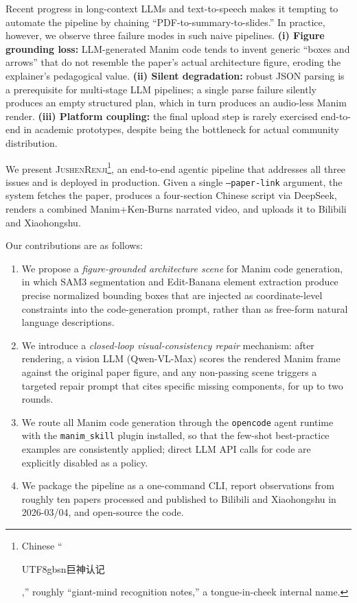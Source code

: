 \documentclass[11pt,a4paper]{article}
\begin{document}
Recent progress in long-context LLMs and text-to-speech makes it tempting to automate the pipeline by chaining ``PDF-to-summary-to-slides.'' In practice, however, we observe three failure modes in such naive pipelines. \textbf{(i) Figure grounding loss:} LLM-generated Manim code tends to invent generic ``boxes and arrows'' that do not resemble the paper's actual architecture figure, eroding the explainer's pedagogical value. \textbf{(ii) Silent degradation:} robust JSON parsing is a prerequisite for multi-stage LLM pipelines; a single parse failure silently produces an empty structured plan, which in turn produces an audio-less Manim render. \textbf{(iii) Platform coupling:} the final upload step is rarely exercised end-to-end in academic prototypes, despite being the bottleneck for actual community distribution.

We present \textsc{JushenRenji}\footnote{Chinese ``\begin{CJK}{UTF8}{gbsn}巨神认记\end{CJK},'' roughly ``giant-mind recognition notes,'' a tongue-in-cheek internal name.}, an end-to-end agentic pipeline that addresses all three issues and is deployed in production. Given a single \texttt{--paper-link} argument, the system fetches the paper, produces a four-section Chinese script via DeepSeek, renders a combined Manim+Ken-Burns narrated video, and uploads it to Bilibili and Xiaohongshu.

Our contributions are as follows:
\begin{enumerate}[leftmargin=*,itemsep=2pt]
    \item We propose a \emph{figure-grounded architecture scene} for Manim code generation, in which SAM3 segmentation \citep{ravi2024sam2,kirillov2023sam} and Edit-Banana element extraction produce precise normalized bounding boxes that are injected as coordinate-level constraints into the code-generation prompt, rather than as free-form natural language descriptions.
    \item We introduce a \emph{closed-loop visual-consistency repair} mechanism: after rendering, a vision LLM (Qwen-VL-Max) scores the rendered Manim frame against the original paper figure, and any non-passing scene triggers a targeted repair prompt that cites specific missing components, for up to two rounds.
    \item We route all Manim code generation through the \texttt{opencode} agent runtime with the \texttt{manim\_skill} plugin installed, so that the few-shot best-practice examples are consistently applied; direct LLM API calls for code are explicitly disabled as a policy.
    \item We package the pipeline as a one-command CLI, report observations from roughly ten papers processed and published to Bilibili and Xiaohongshu in 2026-03/04, and open-source the code.
\end{enumerate}
\end{document}
